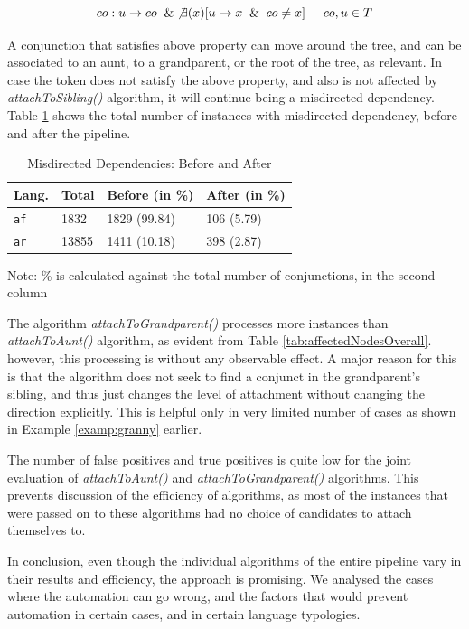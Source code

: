 \begin{equation}
co: u \rightarrow co \And \not\exists(x) [u \rightarrow x \And co \neq x] \hspace{5mm} co, u \in T
\label{eqn:movement-position}
\end{equation}

A conjunction that satisfies above property can move around the tree, and can be associated to an aunt, to a grandparent, or the root of the tree, as relevant. In case the token does not satisfy the above property, and also is not affected by \textit{attachToSibling()} algorithm, it will continue being a misdirected dependency. Table \ref{tab:misdirected-before-after} shows the total number of instances with misdirected dependency, before and after the pipeline.

\begin{table}[H]
    \centering
    \begin{tabular}{|l|l|l|l|}
    \hline
    \textbf{Lang.} & \textbf{Total} & Before (in \%) & After (in \%)\\
    \hline
    \texttt{af} & 1832 & 1829 (99.84) & 106 (5.79)\\
    \texttt{ar} & 13855 & 1411 (10.18) & 398 (2.87)\\
    \hline
    \end{tabular}
    \caption{Misdirected Dependencies: Before and After}
    Note: \% is calculated against the total number of conjunctions, in the second column
    \label{tab:misdirected-before-after}
\end{table}

The algorithm \textit{attachToGrandparent()} processes more instances than \textit{attachToAunt()} algorithm, as evident from Table \ref{tab:affectedNodesOverall}. however, this processing is without any observable effect. A major reason for this is that the algorithm does not seek to find a conjunct in the grandparent's sibling, and thus just changes the level of attachment without changing the direction explicitly. This is helpful only in very limited number of cases as shown in Example \ref{examp:granny} earlier. 

The number of false positives and true positives is quite low for the joint evaluation of \textit{attachToAunt()} and \textit{attachToGrandparent()} algorithms. This prevents discussion of the efficiency of algorithms, as most of the instances that were passed on to these algorithms had no choice of candidates to attach themselves to. 

In conclusion, even though the individual algorithms of the entire pipeline vary in their results and efficiency, the approach is promising. We analysed the cases where the automation can go wrong, and the factors that would prevent automation in certain cases, and in certain language typologies.

\newpage